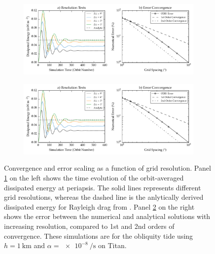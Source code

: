 \begin{figure}[!t]
    \centering
    \begin{subfigure}[t]{0.85\linewidth} %
        \includegraphics[width=\linewidth]{Figures/error_converge}
        \label{fig:conv_a}
    \end{subfigure}
    \begin{subfigure}[t]{0\linewidth} %
         \includegraphics[width=\linewidth]{Figures/error_converge}
         \label{fig:conv_b}   
    \end{subfigure}
    \vspace{-0.5cm}
\caption{Convergence and error scaling as a function of grid resolution. Panel \ref{fig:conv_a} on the left shows the time evolution of the orbit-averaged dissipated energy at periapsis. The solid lines represents different grid resolutions, whereas the dashed line is the anlytically derived dissipated energy for Rayleigh drag from \citet{matsuyama2014tidal}. Panel \ref{fig:conv_b} on the right shows the error between the numerical and analytical solutions with increasing resolution, compared to 1st and 2nd orders of convergence. These simulations are for the obliquity tide using $h = \SI{1}{\kilo\metre}$ and $\alpha = \SI{e-8}{\per\second}$ on Titan. \label{fig:conv}}
\end{figure}

